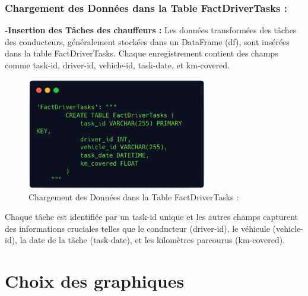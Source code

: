 \newpage
\subsubsection{Chargement des Données dans la Table FactDriverTasks :}
\noindent
\textbf{-Insertion des Tâches des chauffeurs :} Les données transformées des tâches des conducteurs, généralement stockées dans un DataFrame (df), sont insérées dans la table FactDriverTasks. Chaque enregistrement contient des champs comme task-id, driver-id, vehicle-id, task-date, et km-covered.

\begin{figure}[h!]

    \centering
    \includegraphics[width=0.7\textwidth]{chap6.images/load driver tasks.png}
    \caption{ Chargement des Données dans la Table FactDriverTasks :}

\end{figure}

Chaque tâche est identifiée par un task-id unique et les autres champs capturent des informations cruciales telles que le conducteur (driver-id), le véhicule (vehicle-id), la date de la tâche (task-date), et les kilomètres parcourus (km-covered).




















\newpage
\section{Choix des graphiques}

